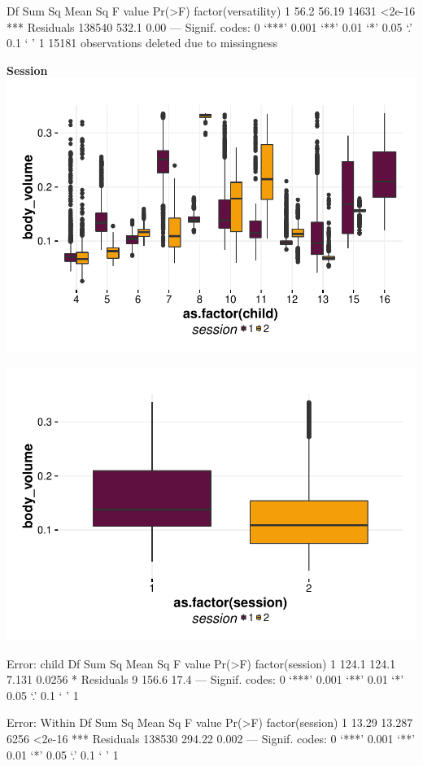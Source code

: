 \documentclass{article}
\begin{document}
\begin{Schunk}
\begin{Soutput}
                        Df Sum Sq Mean Sq F value Pr(>F)    
factor(versatility)      1   56.2   56.19   14631 <2e-16 ***
Residuals           138540  532.1    0.00                   
---
Signif. codes:  0 ‘***’ 0.001 ‘**’ 0.01 ‘*’ 0.05 ‘.’ 0.1 ‘ ’ 1
15181 observations deleted due to missingness
\end{Soutput}
\end{Schunk}


\textbf{Session}
\includegraphics{features-plot_body_volume_child_session_quiz}

\includegraphics{features-plot_body_volume_session_quiz}

\begin{Schunk}
\begin{Soutput}
Error: child
                Df Sum Sq Mean Sq F value Pr(>F)  
factor(session)  1  124.1   124.1   7.131 0.0256 *
Residuals        9  156.6    17.4                 
---
Signif. codes:  0 ‘***’ 0.001 ‘**’ 0.01 ‘*’ 0.05 ‘.’ 0.1 ‘ ’ 1

Error: Within
                    Df Sum Sq Mean Sq F value Pr(>F)    
factor(session)      1  13.29  13.287    6256 <2e-16 ***
Residuals       138530 294.22   0.002                   
---
Signif. codes:  0 ‘***’ 0.001 ‘**’ 0.01 ‘*’ 0.05 ‘.’ 0.1 ‘ ’ 1
\end{Soutput}
\end{Schunk}
\end{document}
